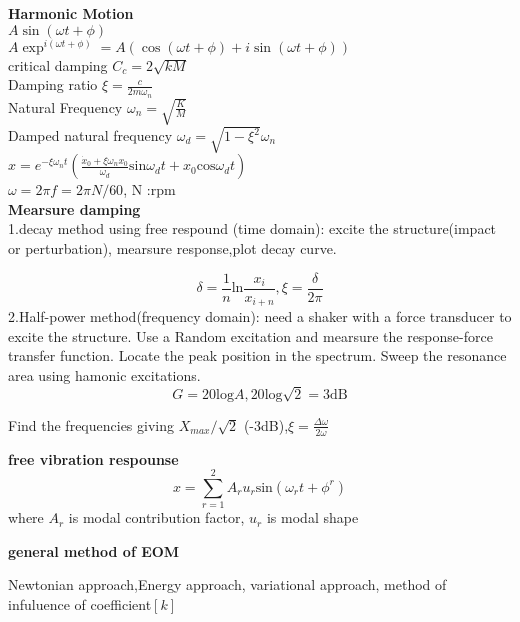 \documentclass{article}
\begin{document}
\thispagestyle{empty}
\begin{multicols*}{3}

  \noindent\textbf{Harmonic Motion}\\
  $A \sin(\omega t + \phi)$\\
  $A \exp^{i(\omega t + \phi)} = A(\cos(\omega t + \phi) + i\sin(\omega t + \phi))$\\
  critical damping $C_{c}=2\sqrt{kM}$\\
  Damping ratio $\xi=\frac{c}{2m\omega_{n}}$\\
  Natural Frequency $\omega_{n}=\sqrt{\frac{K}{M}}$\\
  Damped natural frequency $\omega_{d}=\sqrt{1-\xi^{2}}\omega_{n}$\\
  $x=e^{-\xi \omega_{n}t}(\frac{\dot{x}_{0}+\xi \omega_{n}x_{0}}{\omega_{d}}\text{sin}\omega_{d}t+x_{0}\text{cos}\omega_{d}t)$\\
  $\omega=2\pi f=2\pi N/60$, N :rpm\\

\noindent\textbf{Mearsure damping}\\
1.decay method using free respound (time domain):
excite the structure(impact or perturbation), mearsure response,plot decay curve.

\begin{equation*}
  \delta=\frac{1}{n}\text{ln}\frac{x_{i}}{x_{i+n}}, \xi =\frac{\delta}{2\pi}
\end{equation*}
2.Half-power method(frequency domain): need a shaker with a force transducer to excite the structure. Use a Random excitation and mearsure the response-force transfer function. Locate the peak position in the spectrum.
Sweep the resonance area using hamonic excitations. 
\begin{equation*}
  G=20\text{log}A,20\text{log}\sqrt{2}=3\text{dB}
\end{equation*}



Find the frequencies giving $X_{max}/\sqrt{2}$ (-3dB),$\xi =\frac{\Delta \omega}{2\omega}$

\textbf{free vibration respounse}
\begin{equation*}
  {x}=\sum_{r=1}^{2}A_{r}u_{r}\text{sin}(\omega_{r}t+\phi^{r})
\end{equation*}
where $A_{r}$ is modal contribution factor, $u_{r}$ is modal shape

\textbf{general method of EOM}

Newtonian approach,Energy approach, variational approach,
method of infuluence of coefficient$[k]$


\end{multicols*}
\end{document}
